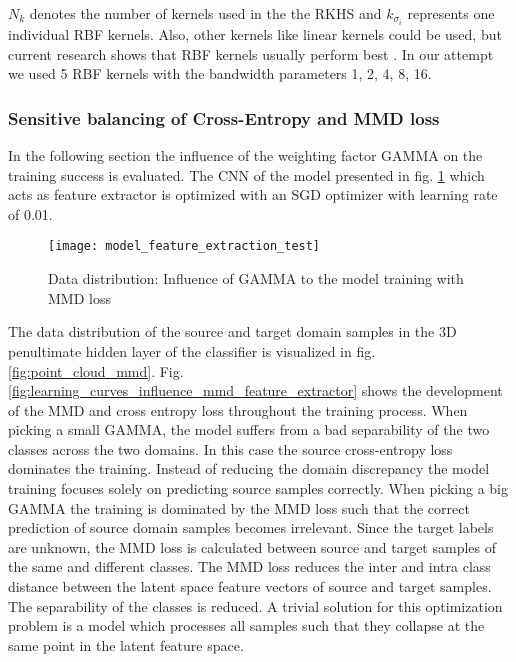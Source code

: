 $N_{k}$ denotes the number of kernels used in the the RKHS and $k_{\sigma_{i}}$ represents one individual RBF kernels. Also, other kernels like linear kernels could be used, but current research shows that RBF kernels usually perform best \cite{AZAMFAR2020103932}. In our attempt we used 5 RBF kernels with the bandwidth parameters 1, 2, 4, 8, 16.


\subsubsection{Sensitive balancing of Cross-Entropy and MMD loss} \label{sec:Balancing Cross-Entropy and MMD loss}

In the following section the influence of the weighting factor GAMMA on the training success is evaluated. The CNN of the model presented in fig. \ref{fig:model_feature_extraction_test} which acts as feature extractor is optimized with an SGD optimizer with learning rate of 0.01.


\begin{figure}[htpb]
  \centering
  \texttt{[image: model\_feature\_extraction\_test]}
  \caption {Data distribution: Influence of GAMMA to the model training with MMD loss} \label{fig:model_feature_extraction_test}
\end{figure}
\FloatBarrier 


The data distribution of the source and target domain samples in the 3D penultimate hidden layer of the classifier is visualized in fig. \ref{fig:point_cloud_mmd}. Fig. \ref{fig:learning_curves_influence_mmd_feature_extractor} shows the development of the MMD and cross entropy loss throughout the training process. When picking a small GAMMA, the model suffers from a bad separability of the two classes across the two domains. In this case the source cross-entropy loss dominates the training. Instead of reducing the domain discrepancy the model training focuses solely on predicting source samples correctly. When picking a big GAMMA the training is dominated by the MMD loss such that the correct prediction of source domain samples becomes irrelevant. Since the target labels are unknown, the MMD loss is calculated between source and target samples of the same and different classes. The MMD loss reduces the inter and intra class distance between the latent space feature vectors of source and target samples. The separability of the classes is reduced. A trivial solution for this optimization problem is a model which processes all samples such that they collapse at the same point in the latent feature space.



